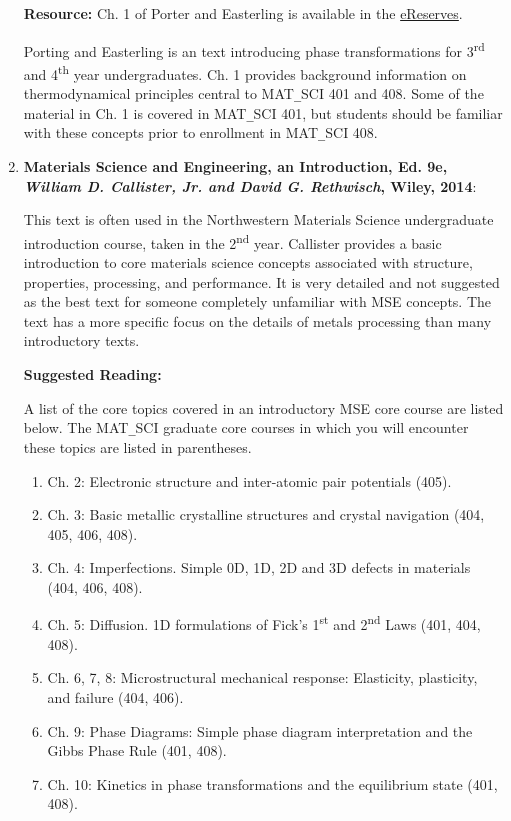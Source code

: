 \begin{enumerate}
		\textbf{Resource:} Ch. 1 of Porter and Easterling is available in the \href{https://northwestern.box.com/s/13myp0an8snmmfjqfbx9gt1gbfrah0aj}{eReserves}. 
	
	Porting and Easterling is an text introducing phase transformations for 3\textsuperscript{rd} and 4\textsuperscript{th} year undergraduates. Ch. 1 provides background information on thermodynamical principles central to MAT\texttt{\_}SCI 401 and 408. Some of the material in Ch. 1 is covered in MAT\texttt{\_}SCI 401, but students should be familiar with these concepts prior to enrollment in MAT\texttt{\_}SCI 408.
	\vspace{2em}

	\item \large \textbf{Materials Science and Engineering, an Introduction, Ed. 9e, \newline
	\textit{William D. Callister, Jr. and David G. Rethwisch}, Wiley, 2014}: \normalsize
	
	This text is often used in the Northwestern Materials Science undergraduate introduction course, taken in the 2\textsuperscript{nd} year. Callister provides a basic introduction to core materials science concepts associated with structure, properties, processing, and performance. It is very detailed and not suggested as the best text for someone completely unfamiliar with MSE concepts. The text has a more specific focus on the details of metals processing than many introductory texts.
	
	\textbf{Suggested Reading:}
	
	A list of the core topics covered in an introductory MSE core course are listed below. The MAT\texttt{\_}SCI graduate core courses in which you will encounter these topics are listed in parentheses.
	
	\begin{enumerate}
		\item Ch. 2: Electronic structure and inter-atomic pair potentials (405).
		\item Ch. 3: Basic metallic crystalline structures and crystal navigation (404, 405, 406, 408).
		\item Ch. 4: Imperfections. Simple 0D, 1D, 2D and 3D defects in materials (404, 406, 408).
		\item Ch. 5: Diffusion. 1D formulations of Fick's 1\textsuperscript{st} and 2\textsuperscript{nd} Laws (401, 404, 408).
		\item Ch. 6, 7, 8: Microstructural mechanical response: Elasticity, plasticity, and failure (404, 406).
		\item Ch. 9: Phase Diagrams: Simple phase diagram interpretation and the Gibbs Phase Rule (401, 408).
		\item Ch. 10: Kinetics in phase transformations and the equilibrium state (401, 408).
	\end{enumerate}
	

\end{enumerate}
